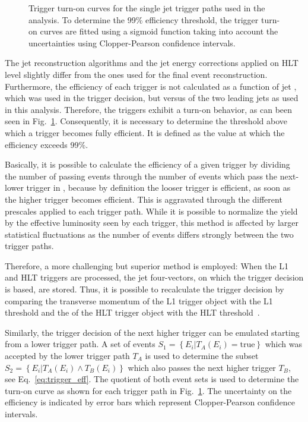 \begin{figure}[htbp]
    \caption[Turn-on curves of single jet HLT trigger paths]{Trigger turn-on curves for the single jet trigger
    paths used in the analysis. To determine the 99\% efficiency threshold, the
    trigger turn-on curves are fitted using a sigmoid function taking into account the
    uncertainties using Clopper-Pearson confidence intervals.}
    \label{fig:trigger_eff}
\end{figure}

The jet reconstruction algorithms and the jet energy corrections applied on HLT
level slightly differ from the ones used for the final event reconstruction.
Furthermore, the efficiency of each trigger is not calculated as a function of
jet \pt, which was used in the trigger decision, but versus \ptavg of the two
leading jets as used in this analysis. Therefore, the triggers exhibit a turn-on
behavior, as can been seen in Fig.~\ref{fig:trigger_eff}. Consequently, it is
necessary to determine the threshold above which a trigger becomes fully
efficient. It is defined as the value at which the efficiency exceeds 99\%.

Basically, it is possible to calculate the efficiency of a given trigger by
dividing the number of passing events through the number of events which pass
the next-lower trigger in \pt, because by definition the looser trigger is efficient,
as soon as the higher trigger becomes efficient. This is aggravated through the
different prescales applied to each trigger path. While it is possible to
normalize the yield by the effective luminosity seen by each trigger, this
method is affected by larger statistical fluctuations as the number of events
differs strongly between the two trigger paths.

Therefore, a more challenging but superior method is employed: When the L1
and HLT triggers are processed, the jet four-vectors, on
which the trigger decision is based, are stored. Thus, it is possible to
recalculate the trigger decision by comparing the transverse momentum of the L1
trigger object with the L1 threshold and the \pt of the HLT trigger object with
the HLT threshold~\cite{Stober:2012abc}.

Similarly, the trigger decision of the next higher trigger can be emulated
starting from a lower trigger path. A set of events $S_1 = \left\{E_i | T_A
(E_i) = \mathrm{true} \right\}$ which was accepted  by the lower trigger path $T_A$ is
used to determine the subset $S_2 = \left\{E_i|T_A(E_i) \wedge  T_B(E_i)
\right\}$ which also passes the next higher trigger $T_B$, see
Eq.~\ref{eq:trigger_eff}. The quotient of both event sets is used to determine
the turn-on curve as shown for each trigger path in Fig.~\ref{fig:trigger_eff}. 
The uncertainty on the efficiency is
indicated by error bars which represent Clopper-Pearson confidence intervals.

